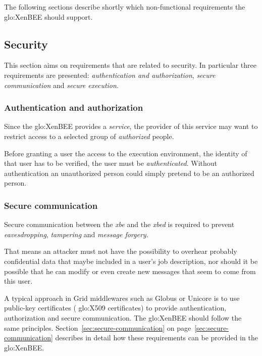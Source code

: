 The following sections  describe shortly which non-functional requirements
the \gls{glo:XenBEE} should support.

\subsection{Security}

This  section aims  on  requirements  that are  related  to security.   In
particular  three  requirements  are presented:  \emph{authentication  and
  authorization}, \emph{secure communication} and \emph{secure execution}.

\subsubsection{Authentication and authorization}

Since the \gls{glo:XenBEE} provides a \emph{service}, the provider of this
service   may  want   to  restrict   access   to  a   selected  group   of
\emph{authorized} people.

Before  granting a  user  the  access to  the  execution environment,  the
identity  of  that  user  has  to  be  verified,  \ie  the  user  must  be
\emph{authenticated}. Without authentication  an unauthorized person could
simply pretend to be an authorized person.

\subsubsection{Secure communication}

Secure  communication  between  the  \emph{xbe}  and  the  \emph{xbed}  is
required    to   prevent   \emph{eavesdropping},    \emph{tampering}   and
\emph{message forgery}. 

That means an attacker must  not have the possibility to overhear probably
confidential data  that maybe  included in a  user's job  description, nor
should it be possible that he  can modify or even create new messages that
seem  to come from  this user.

A typical  approach in  Grid middlewares such  as Globus  \cite{globus} or
Unicore   \cite{unicore}   is   to   use  public-key   certificates   (\eg
\gls{glo:X509} certificates) to  provide authentication, authorization and
secure  communication.   The   \gls{glo:XenBEE}  should  follow  the  same
principles.            Section~\ref{sec:secure-communication}           on
page~\ref{sec:secure-communication}   describes   in   detail  how   these
requirements can be provided in the \gls{glo:XenBEE}.

